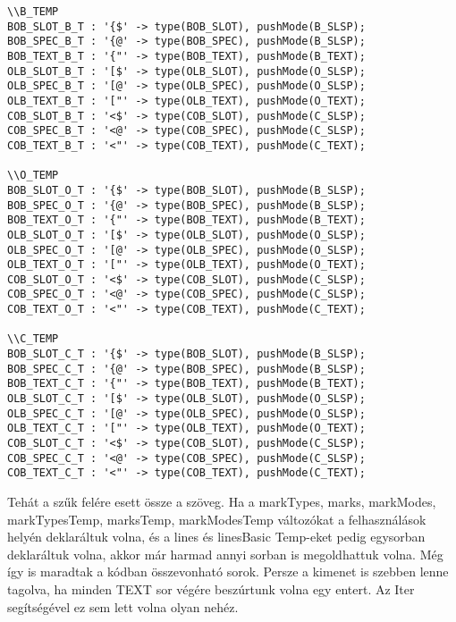 \begin{verbatim}
\\B_TEMP
BOB_SLOT_B_T : '{$' -> type(BOB_SLOT), pushMode(B_SLSP);
BOB_SPEC_B_T : '{@' -> type(BOB_SPEC), pushMode(B_SLSP);
BOB_TEXT_B_T : '{"' -> type(BOB_TEXT), pushMode(B_TEXT);
OLB_SLOT_B_T : '[$' -> type(OLB_SLOT), pushMode(O_SLSP);
OLB_SPEC_B_T : '[@' -> type(OLB_SPEC), pushMode(O_SLSP);
OLB_TEXT_B_T : '["' -> type(OLB_TEXT), pushMode(O_TEXT);
COB_SLOT_B_T : '<$' -> type(COB_SLOT), pushMode(C_SLSP);
COB_SPEC_B_T : '<@' -> type(COB_SPEC), pushMode(C_SLSP);
COB_TEXT_B_T : '<"' -> type(COB_TEXT), pushMode(C_TEXT);

\\O_TEMP
BOB_SLOT_O_T : '{$' -> type(BOB_SLOT), pushMode(B_SLSP);
BOB_SPEC_O_T : '{@' -> type(BOB_SPEC), pushMode(B_SLSP);
BOB_TEXT_O_T : '{"' -> type(BOB_TEXT), pushMode(B_TEXT);
OLB_SLOT_O_T : '[$' -> type(OLB_SLOT), pushMode(O_SLSP);
OLB_SPEC_O_T : '[@' -> type(OLB_SPEC), pushMode(O_SLSP);
OLB_TEXT_O_T : '["' -> type(OLB_TEXT), pushMode(O_TEXT);
COB_SLOT_O_T : '<$' -> type(COB_SLOT), pushMode(C_SLSP);
COB_SPEC_O_T : '<@' -> type(COB_SPEC), pushMode(C_SLSP);
COB_TEXT_O_T : '<"' -> type(COB_TEXT), pushMode(C_TEXT);

\\C_TEMP
BOB_SLOT_C_T : '{$' -> type(BOB_SLOT), pushMode(B_SLSP);
BOB_SPEC_C_T : '{@' -> type(BOB_SPEC), pushMode(B_SLSP);
BOB_TEXT_C_T : '{"' -> type(BOB_TEXT), pushMode(B_TEXT);
OLB_SLOT_C_T : '[$' -> type(OLB_SLOT), pushMode(O_SLSP);
OLB_SPEC_C_T : '[@' -> type(OLB_SPEC), pushMode(O_SLSP);
OLB_TEXT_C_T : '["' -> type(OLB_TEXT), pushMode(O_TEXT);
COB_SLOT_C_T : '<$' -> type(COB_SLOT), pushMode(C_SLSP);
COB_SPEC_C_T : '<@' -> type(COB_SPEC), pushMode(C_SLSP);
COB_TEXT_C_T : '<"' -> type(COB_TEXT), pushMode(C_TEXT);
\end{verbatim}

Tehát a szűk felére esett össze a szöveg.
Ha a markTypes, marks, markModes, markTypesTemp, marksTemp, markModesTemp változókat a felhasználások helyén deklaráltuk volna,
és a lines és linesBasic Temp-eket pedig egysorban deklaráltuk volna, akkor már harmad annyi sorban is megoldhattuk volna.
Még így is maradtak a kódban összevonható sorok.
Persze a kimenet is szebben lenne tagolva, ha minden TEXT sor végére beszúrtunk volna egy entert.
Az Iter segítségével ez sem lett volna olyan nehéz.
